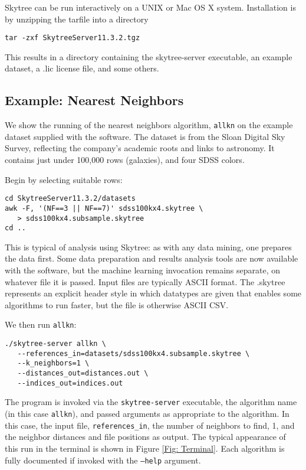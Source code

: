 Skytree can be run interactively on a UNIX or Mac OS X system. Installation is by unzipping the tarfile into a directory

\begin{verbatim}
tar -zxf SkytreeServer11.3.2.tgz
\end{verbatim}

This results in a directory containing the skytree-server executable, an example dataset, a .lic license file, and some others.

\subsection{Example: Nearest Neighbors}

We show the running of the nearest neighbors algorithm, {\tt allkn} on the example dataset supplied with the software. The dataset is from the Sloan Digital Sky Survey, reflecting the company's academic roots and links to astronomy. It contains just under 100,000 rows (galaxies), and four SDSS colors.

Begin by selecting suitable rows:

\begin{verbatim}
cd SkytreeServer11.3.2/datasets
awk -F, '(NF==3 || NF==7)' sdss100kx4.skytree \
   > sdss100kx4.subsample.skytree
cd ..
\end{verbatim}

This is typical of analysis using Skytree: as with any data mining, one prepares the data first. Some data preparation and results analysis tools are now available with the software, but the machine learning invocation remains separate, on whatever file it is passed. Input files are typically ASCII format. The .skytree represents an explicit header style in which datatypes are given that enables some algorithms to run faster, but the file is otherwise ASCII CSV.

We then run {\tt allkn}:

\begin{verbatim}
./skytree-server allkn \
   --references_in=datasets/sdss100kx4.subsample.skytree \
   --k_neighbors=1 \
   --distances_out=distances.out \
   --indices_out=indices.out
\end{verbatim}

The program is invoked via the {\tt skytree-server} executable, the algorithm name (in this case {\tt allkn}), and passed arguments as appropriate to the algorithm. In this case, the input file, {\tt references\_in}, the number of neighbors to find, 1, and the neighbor distances and file positions as output. The typical appearance of this run in the terminal is shown in Figure \ref{Fig: Terminal}. Each algorithm is fully documented if invoked with the {\tt --help} argument.

